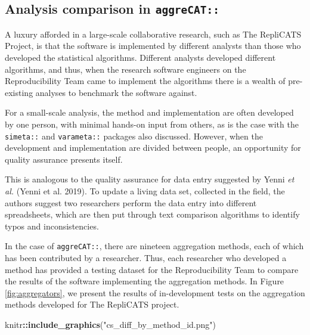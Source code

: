 \documentclass[
]{article}
\newenvironment{Shaded}{\begin{snugshade}}{\end{snugshade}}
\newcommand{\KeywordTok}[1]{\textcolor[rgb]{0.13,0.29,0.53}{\textbf{#1}}}
\newcommand{\NormalTok}[1]{#1}
\newcommand{\OperatorTok}[1]{\textcolor[rgb]{0.81,0.36,0.00}{\textbf{#1}}}
\newcommand{\StringTok}[1]{\textcolor[rgb]{0.31,0.60,0.02}{#1}}
\begin{document}
\hypertarget{analysis-comparison-in-aggrecat}{%
\subsection{\texorpdfstring{Analysis comparison in \texttt{aggreCAT::}}{Analysis comparison in aggreCAT::}}\label{analysis-comparison-in-aggrecat}}

A luxury afforded in a large-scale collaborative research, such as The RepliCATS Project, is that the software is implemented by different analysts than those who developed the statistical algorithms. Different analysts developed different algorithms, and thus, when the research software engineers on the Reproducibility Team came to implement the algorithms there is a wealth of pre-existing analyses to benchmark the software against.

For a small-scale analysis, the method and implementation are often developed by one person, with minimal hands-on input from others, as is the case with the \texttt{simeta::} and \texttt{varameta::} packages also discussed. However, when the development and implementation are divided between people, an opportunity for quality assurance presents itself.

This is analogous to the quality assurance for data entry suggested by Yenni \emph{et al.} (Yenni et al. 2019). To update a living data set, collected in the field, the authors suggest two researchers perform the data entry into different spreadsheets, which are then put through text comparison algorithms to identify typos and inconsistencies.

In the case of \texttt{aggreCAT::}, there are nineteen aggregation methods, each of which has been contributed by a researcher. Thus, each researcher who developed a method has provided a testing dataset for the Reproducibility Team to compare the results of the software implementing the aggregation methods.
In Figure \ref{fig:aggregators}, we present the results of in-development tests on the aggregation methods developed for The RepliCATS project.

\begin{Shaded}
\begin{Highlighting}[]
\NormalTok{knitr}\OperatorTok{::}\KeywordTok{include\_graphics}\NormalTok{(}\StringTok{"cs\_diff\_by\_method\_id.png"}\NormalTok{)}
\end{Highlighting}
\end{Shaded}
\end{document}
